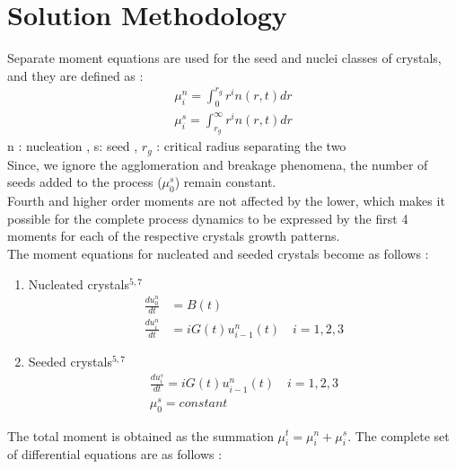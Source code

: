 
\section{Solution Methodology}

Separate moment equations are used for the seed and nuclei classes of crystals, and they are defined as : 
\begin{align}
\mu^{n}_{i} = \int_{0}^{r_{g}} r^{i}n(r,t) dr \\
\mu^{s}_{i} = \int_{r_{g}}^{\infty} r^{i}n(r,t) dr
\end{align}
n : nucleation , s: seed , $r_{g}$  : critical radius separating the two \\  
Since, we ignore the agglomeration and breakage phenomena, the number of seeds added to the process ($\mu_{0}^{s}$) remain constant.\\
Fourth and higher order moments are not affected by the lower, which makes it possible for the complete process dynamics to be expressed by the first 4 moments for each of the respective crystals growth patterns.\\
The moment equations for nucleated and seeded crystals become as follows\cite{yenkie} :

\begin{enumerate}

\item Nucleated crystals$^{5,7}$ 
\begin{align}
\frac{du_{0}^{n}}{dt} &= B(t) \\
\frac{du_{i}^{n}}{dt} &= iG(t)u_{i-1}^{n}(t) \quad  i = 1,2,3
\end{align}

\item Seeded crystals$^{5,7}$
\begin{align}
\frac{du_{i}^{s}}{dt} = iG(t)u_{i-1}^{n}(t) \quad  i = 1,2,3 \\
\mu_{0}^{s} = constant
\end{align}

\end{enumerate}
The total moment is obtained as the summation $\mu_{i}^{t} = \mu_{i}^{n} + \mu_{i}^{s}$. 
The complete set of differential equations are as follows :

